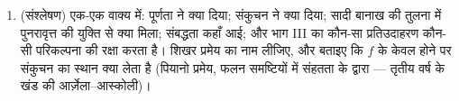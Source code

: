 \begin{problem}[{सप्ताहांत समस्या --- पिकार--लिंडलोफ़
प्रमेय}]
\begin{enumerate}[resume]
        अस्तित्व और अद्वितीयता वैश्विक हैं --- यह \cref{ch:b2:diffeq} की
        कोशी--लिप्शिट्स प्रमेय की अदिश स्थिति है, जिसमें लंबाई $B - A$ पर
        कोई प्रतिबंध नहीं।
  \item (संश्लेषण) एक-एक वाक्य में: पूर्णता ने क्या दिया; संकुचन ने
        क्या दिया; सादी बानाख की तुलना में पुनरावृत्त की युक्ति से क्या
        मिला; संबद्धता कहाँ आई; और भाग III का कौन-सा प्रतिउदाहरण
        कौन-सी परिकल्पना की रक्षा करता है। शिखर प्रमेय का नाम लीजिए, और
        बताइए कि $f$ के केवल  होने पर संकुचन का स्थान क्या लेता
        है (पियानो प्रमेय, फलन समष्टियों में संहतता के द्वारा ---
        तृतीय वर्ष के खंड की आर्ज़ेला--आस्कोली)।
\end{enumerate}
\end{problem}
